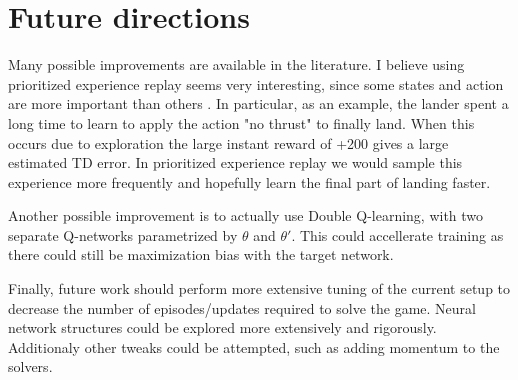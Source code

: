 \documentclass{article}
\begin{document}
\section{Future directions}
Many possible improvements are available in the literature. I believe using prioritized experience replay seems very interesting, since some states and action are more important than others \cite{Schaul2016PrioritizedER}. In particular, as an example, the lander spent a long time to learn to apply the action "no thrust" to finally land. When this occurs due to exploration the large instant reward of +200 gives a large estimated TD error. In prioritized experience replay we would sample this experience more frequently and hopefully learn the final part of landing faster.

Another possible improvement is to actually use Double Q-learning, with two separate Q-networks parametrized by $\theta$ and $\theta'$. This could accellerate training as there could still be maximization bias with the target network.

Finally, future work should perform more extensive tuning of the current setup to decrease the number of episodes/updates required to solve the game. Neural network structures could be explored more extensively and rigorously. Additionaly other tweaks could be attempted, such as adding momentum to the solvers.






\end{document}
